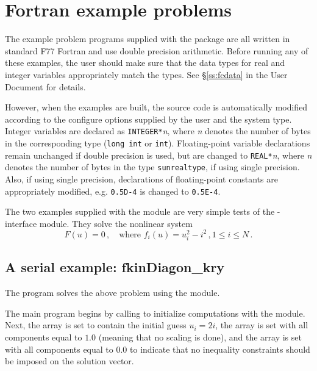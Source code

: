 \section{Fortran example problems}\label{s:ex_fortran}

The {\F} example problem programs supplied with the {\kinsol}
package are all written in standard F77 Fortran and use double precision
arithmetic.  Before running any of these examples, the user should
make sure that the {\F} data types for real and integer variables
appropriately match the {\CC} types.  See \S\ref{ss:fcdata} in the
{\kinsol} User Document for details.


 However, when the {\F} examples are built, the source code is
automatically modified according to the configure options supplied by the
user and the system type. Integer variables are declared as {\tt INTEGER*}{\em n},
where {\em n} denotes the number of bytes in the corresponding {\CC} type
({\tt long int} or {\tt int}). Floating-point variable declarations remain
unchanged if double precision is used, but are changed to {\tt REAL*}{\em n},
where {\em n} denotes the number of bytes in the {\sundials} type {\tt sunrealtype},
if using single precision. Also, if using single precision, declarations of
floating-point constants are appropriately modified, e.g. {\tt 0.5D-4} is
changed to {\tt 0.5E-4}.


The two examples supplied with the {\fkinsol} module are very simple tests 
of the {\F}-{\CC} interface module. 
They solve the nonlinear system
\begin{equation*}
  F(u) = 0 \, , \quad \text{where } f_i(u) = u_i^2 - i^2 \, , 1 \le i \le N \, . 
\end{equation*}

\subsection{A serial example: fkinDiagon\_kry}\label{ss:fkinDiagon_kry}

The  program solves the above problem using the {\nvecs} module.

The main program begins by calling  to initialize computations
with the {\nvecs} module. Next, the array  is set to contain
the initial guess $u_i = 2 i$, the array  is set with all 
components equal to $1.0$ (meaning that no scaling is done), and the array
 is set with all components equal to $0.0$ to indicate that no 
inequality constraints should be imposed on the solution vector.

